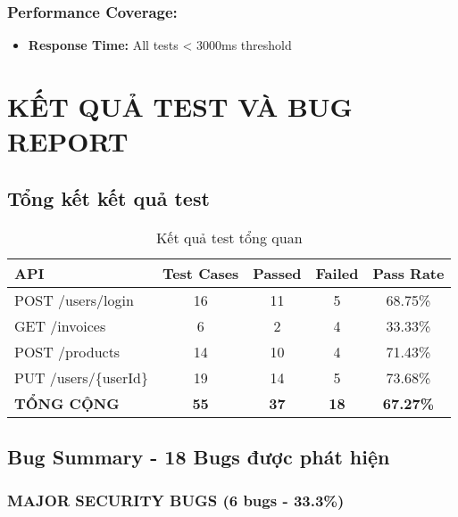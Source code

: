 \documentclass[12pt,a4paper]{article}
\begin{document}
  \subsubsection{Performance Coverage:}
  \begin{itemize}
  \item \textbf{Response Time:} All tests < 3000ms threshold
  \end{itemize}

  \section{KẾT QUẢ TEST VÀ BUG REPORT}

  \subsection{Tổng kết kết quả test}

  \begin{table}[H]
  \centering
  \begin{tabular}{|l|c|c|c|c|}
  \hline
  \textbf{API} & \textbf{Test Cases} & \textbf{Passed} & \textbf{Failed} & \textbf{Pass Rate} \\
  \hline
  POST /users/login & 16 & 11 & 5 & 68.75\% \\
  \hline
  GET /invoices & 6 & 2 & 4 & 33.33\% \\
  \hline
  POST /products & 14 & 10 & 4 & 71.43\% \\
  \hline
  PUT /users/\{userId\} & 19 & 14 & 5 & 73.68\% \\
  \hline
  \textbf{TỔNG CỘNG} & \textbf{55} & \textbf{37} & \textbf{18} & \textbf{67.27\%} \\
  \hline
  \end{tabular}
  \caption{Kết quả test tổng quan}
  \end{table}

  \subsection{Bug Summary - 18 Bugs được phát hiện}

  \subsubsection{MAJOR SECURITY BUGS (6 bugs - 33.3\%)}
\end{document}
